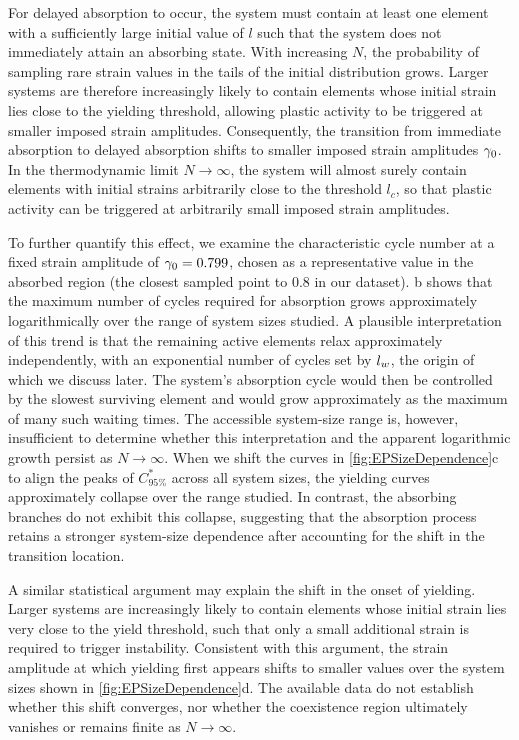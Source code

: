 For delayed absorption to occur, the system must contain at least one element with a sufficiently large initial value of $l$ such that the system does not immediately attain an absorbing state. With increasing $N$, the probability of sampling rare strain values in the tails of the initial distribution grows. Larger systems are therefore increasingly likely to contain elements whose initial strain lies close to the yielding threshold, allowing plastic activity to be triggered at smaller imposed strain amplitudes. Consequently, the transition from immediate absorption to delayed absorption shifts to smaller imposed strain amplitudes $\gamma_0$. In the thermodynamic limit $N\to\infty$, the system will almost surely contain elements with initial strains arbitrarily close to the threshold $l_c$, so that plastic activity can be triggered at arbitrarily small imposed strain amplitudes. 

To further quantify this effect, we examine the characteristic cycle number at a fixed strain amplitude of $\gamma_0=0.799$, chosen as a representative value in the absorbed region (the closest sampled point to $0.8$ in our dataset). b shows that the maximum number of cycles required for absorption grows approximately logarithmically over the range of system sizes studied. A plausible interpretation of this trend is that the remaining active elements relax approximately independently, with an exponential number of cycles set by $l_w$, the origin of which we discuss later. The system's absorption cycle would then be controlled by the slowest surviving element and would grow approximately as the maximum of many such waiting times. The accessible system-size range is, however, insufficient to determine whether this interpretation and the apparent logarithmic growth persist as $N\to\infty$. When we shift the curves in \cref{fig:EPSizeDependence}c to align the peaks of $C^*_{95\%}$ across all system sizes, the yielding curves approximately collapse over the range studied. In contrast, the absorbing branches do not exhibit this collapse, suggesting that the absorption process retains a stronger system-size dependence after accounting for the shift in the transition location.

A similar statistical argument may explain the shift in the onset of yielding. Larger systems are increasingly likely to contain elements whose initial strain lies very close to the yield threshold, such that only a small additional strain is required to trigger instability. Consistent with this argument, the strain amplitude at which yielding first appears shifts to smaller values over the system sizes shown in \cref{fig:EPSizeDependence}d. The available data do not establish whether this shift converges, nor whether the coexistence region ultimately vanishes or remains finite as $N\to\infty$.

